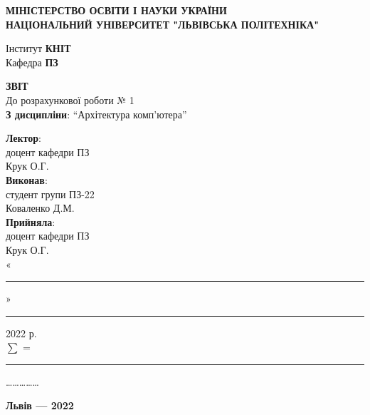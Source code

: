 \documentclass{article}
\newcommand\subject{Архітектура комп'ютера}
\newcommand\lecturer{доцент кафедри ПЗ\\Крук О.Г.}
\newcommand\teacher{доцент кафедри ПЗ\\Крук О.Г.}
\newcommand\mygroup{ПЗ-22}
\newcommand\lab{1}
\begin{document}
\begin{normalsize}
	\begin{titlepage}
		\thispagestyle{empty}
		\begin{center}
			\textbf{МІНІСТЕРСТВО ОСВІТИ І НАУКИ УКРАЇНИ\\
				НАЦІОНАЛЬНИЙ УНІВЕРСИТЕТ "ЛЬВІВСЬКА ПОЛІТЕХНІКА"}
		\end{center}
		\begin{flushright}
			Інститут \textbf{КНІТ}\\
			Кафедра \textbf{ПЗ}
		\end{flushright}
		\vspace{200pt}
		\begin{center}
			\textbf{ЗВІТ}\\
			\vspace{10pt}
			До розрахункової роботи № \lab\\
			\textbf{З дисципліни}: “\subject”
		\end{center}
		\vspace{112pt}
		\begin{flushright}
			
			\textbf{Лектор}:\\
			\lecturer\\
			\vspace{28pt}
			\textbf{Виконав}:\\
			
			студент групи \mygroup\\
			Коваленко Д.М.\\
			\vspace{28pt}
			\textbf{Прийняла}:\\
			
			\teacher\\
			
			\vspace{28pt}
			«\rule{1cm}{0.15mm}» \rule{1.5cm}{0.15mm} 2022 р.\\
			$\sum$ = \rule{1cm}{0.15mm}……………\\
			
		\end{flushright}
		\vspace{\fill}
		\begin{center}
			\textbf{Львів — 2022}
		\end{center}
	\end{titlepage}


\end{normalsize}
\end{document}
